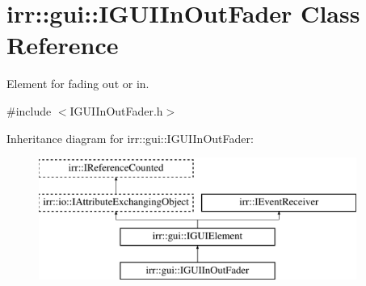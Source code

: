 \hypertarget{classirr_1_1gui_1_1IGUIInOutFader}{}\section{irr\+:\+:gui\+:\+:I\+G\+U\+I\+In\+Out\+Fader Class Reference}
\label{classirr_1_1gui_1_1IGUIInOutFader}


Element for fading out or in.  




{\ttfamily \#include $<$I\+G\+U\+I\+In\+Out\+Fader.\+h$>$}

Inheritance diagram for irr\+:\+:gui\+:\+:I\+G\+U\+I\+In\+Out\+Fader\+:\begin{figure}[H]
\begin{center}
\leavevmode
\includegraphics[height=4.000000cm]{classirr_1_1gui_1_1IGUIInOutFader}
\end{center}
\end{figure}
